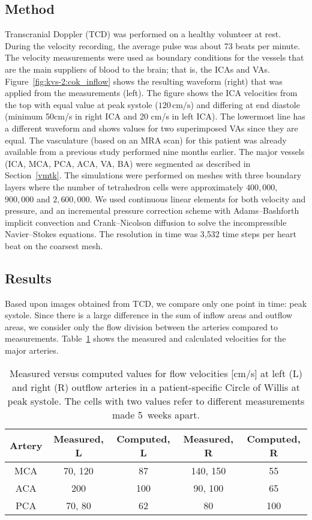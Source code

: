 \subsection{Method}

Transcranial Doppler (TCD) was performed on a healthy volunteer at
rest. During the velocity recording, the average pulse was about 73
beats per minute. The velocity measurements were used as boundary
conditions for the vessels that are the main suppliers of blood to the
brain; that is, the ICAs and VAs. Figure~\ref{fig:kvs-2:cok_inflow}
shows the resulting waveform (right) that was applied from the
measurements (left). The figure shows the ICA velocities from the top
with equal value at peak systole ($120\,\mathrm{cm}/\mathrm{s}$) and
differing at end diastole (minimum 50cm/s in right ICA and 20 cm/s in
left ICA). The lowermost line has a different waveform and shows
values for two superimposed VAs since they are equal. The vasculature
(based on an MRA scan) for this patient was already available from a
previous study performed nine months earlier. The major vessels (ICA,
MCA, PCA, ACA, VA, BA) were segmented as described in
Section~\ref{vmtk}. The simulations were performed on meshes with
three boundary layers where the number of tetrahedron cells were
approximately $400,000$, $900,000$ and $2,600,000$. We used continuous
linear elements for both velocity and pressure, and an \nobreak incremental
pressure correction scheme with Adams--Bashforth implicit convection
and Crank--Nicolson diffusion to solve the incompressible
Navier--Stokes equations. The resolution in time was 3,532 time steps
per heart beat on the coarsest mesh.

\subsection{Results}

Based upon images obtained from TCD, we compare only one point in
time: peak systole. Since there is a large difference in the sum of
inflow areas and outflow areas, we consider only the flow division
between the arteries compared to measurements.
Table~\ref{measure_vs_comp} shows the measured and calculated
velocities for the major arteries.

\begin{table}[!t]
\linenumbersep-4.2pc
\centering
\begin{tabular}{ccccc}\toprule
    Artery &Measured, L&Computed, L &Measured, R&Computed, R \\
    \midrule
    MCA & 70, 120 		& 87  & 140, 150 	& 55	\\
    ACA & 200  		& 100  	& 90, 100 	& 65	\\
    PCA & 70, 80  		& 62 	& 80  		& 100  \\
    \bottomrule
  \end{tabular}
  \caption{Measured versus computed values for flow
    velocities [cm/s] at left (L) and right (R) outflow arteries in a patient-specific Circle of Willis at peak systole. The cells with two values refer to different measurements
    made 5~weeks apart.}\label{measure_vs_comp}\vspace*{6pt}
\end{table}


